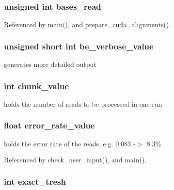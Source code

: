 \subsubsection[{bases\_\-read}]{\setlength{\rightskip}{0pt plus 5cm}unsigned int {\bf bases\_\-read}}\label{saruman_8h_b572df0faf4b4c4664e8adc09f305482}




Referenced by main(), and prepare\_\-cuda\_\-alignments().
\subsubsection[{be\_\-verbose\_\-value}]{\setlength{\rightskip}{0pt plus 5cm}unsigned short int {\bf be\_\-verbose\_\-value}}\label{saruman_8h_e87ca0c58972a2f744b0fcbb8387cf2e}


generates more detailed output 
\subsubsection[{chunk\_\-value}]{\setlength{\rightskip}{0pt plus 5cm}int {\bf chunk\_\-value}}\label{saruman_8h_0981f0fb32a249e501c5f87dbfaaf13f}


holds the number of reads to be processed in one run 
\subsubsection[{error\_\-rate\_\-value}]{\setlength{\rightskip}{0pt plus 5cm}float {\bf error\_\-rate\_\-value}}\label{saruman_8h_19d9bf4bb9cbcac470f6e66273ae046b}


holds the error rate of the reads, e.g. 0.083 -$>$ 8.3\% 

Referenced by check\_\-user\_\-input(), and main().
\subsubsection[{exact\_\-tresh}]{\setlength{\rightskip}{0pt plus 5cm}int {\bf exact\_\-tresh}}\label{saruman_8h_f36ba40fe509a366a36e5d3197d42857}




